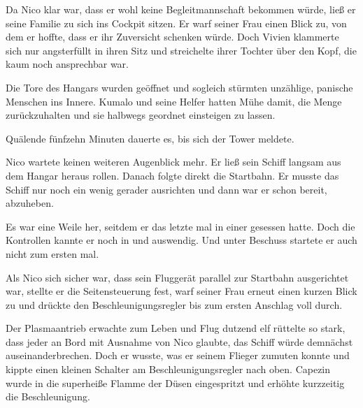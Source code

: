 Da Nico klar war, dass er wohl keine Begleitmannschaft bekommen würde, ließ er seine Familie zu sich ins Cockpit sitzen. Er warf seiner Frau einen Blick zu, von dem er hoffte, dass er ihr Zuversicht schenken würde. Doch Vivien klammerte sich nur angsterfüllt in ihren Sitz und streichelte ihrer Tochter über den Kopf, die kaum noch ansprechbar war.

\par

Die Tore des Hangars wurden geöffnet und sogleich stürmten unzählige, panische Menschen ins Innere. Kumalo und seine Helfer hatten Mühe damit, die Menge zurückzuhalten und sie halbwegs geordnet einsteigen zu lassen.

\par

Quälende fünfzehn Minuten dauerte es, bis sich der Tower meldete. 

\par

Nico wartete keinen weiteren Augenblick mehr. Er ließ sein Schiff langsam aus dem Hangar heraus rollen. Danach folgte direkt die Startbahn. Er musste das Schiff nur noch ein wenig gerader ausrichten und dann war er schon bereit, abzuheben.

\par

Es war eine Weile her, seitdem er das letzte mal in einer  gesessen hatte. Doch die Kontrollen kannte er noch in und auswendig. Und unter Beschuss startete er auch nicht zum ersten mal.

\par

Als Nico sich sicher war, dass sein Fluggerät parallel zur Startbahn ausgerichtet war, stellte er die Seitensteuerung fest, warf seiner Frau erneut einen kurzen Blick zu und drückte den Beschleunigungsregler bis zum ersten Anschlag voll durch.

\par

Der Plasmaantrieb erwachte zum Leben und Flug dutzend elf rüttelte so stark, dass jeder an Bord mit Ausnahme von Nico glaubte, das Schiff würde demnächst auseinanderbrechen. Doch er wusste, was er seinem Flieger zumuten konnte und kippte einen kleinen Schalter am Beschleunigungsregler nach oben. Capezin wurde in die superheiße Flamme der Düsen eingespritzt und erhöhte kurzzeitig die Beschleunigung.

